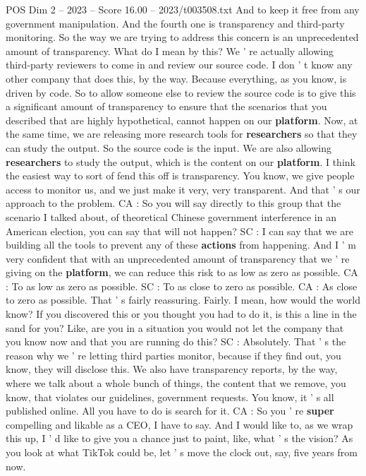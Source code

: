 \begin{textsample}{POS Dim 2 – 2023 – Score 16.00 – 2023/t003508.txt}
And to keep it free from any government manipulation.
And the fourth one is transparency and third-party monitoring.
So the way we are trying to address this concern is an unprecedented amount of transparency.
What do I mean by this?
We ' re actually allowing third-party reviewers to come in and review our source code.
I don ' t know any other company that does this, by the way.
Because everything, as you know, is driven by code.
So to allow someone else to review the source code is to give this a significant amount of transparency to ensure that the scenarios that you described that are highly hypothetical, cannot happen on our \textbf{platform}.
Now, at the same time, we are releasing more research tools for \textbf{researchers} so that they can study the output.
So the source code is the input.
We are also allowing \textbf{researchers} to study the output, which is the content on our \textbf{platform}.
I think the easiest way to sort of fend this off is transparency.
You know, we give people access to monitor us, and we just make it very, very transparent.
And that ' s our approach to the problem.
CA : So you will say directly to this group that the scenario I talked about, of theoretical Chinese government interference in an American election, you can say that will not happen?
SC : I can say that we are building all the tools to prevent any of these \textbf{actions} from happening.
And I ' m very confident that with an unprecedented amount of transparency that we ' re giving on the \textbf{platform}, we can reduce this risk to as low as zero as possible.
CA : To as low as zero as possible.
SC : To as close to zero as possible.
CA : As close to zero as possible.
That ' s fairly reassuring.
Fairly.
I mean, how would the world know?
If you discovered this or you thought you had to do it, is this a line in the sand for you?
Like, are you in a situation you would not let the company that you know now and that you are running do this?
SC : Absolutely.
That ' s the reason why we ' re letting third parties monitor, because if they find out, you know, they will disclose this.
We also have transparency reports, by the way, where we talk about a whole bunch of things, the content that we remove, you know, that violates our guidelines, government requests.
You know, it ' s all published online.
All you have to do is search for it.
CA : So you ' re \textbf{super} compelling and likable as a CEO, I have to say.
And I would like to, as we wrap this up, I ' d like to give you a chance just to paint, like, what ' s the vision?
As you look at what TikTok could be, let ' s move the clock out, say, five years from now.

\end{textsample}
